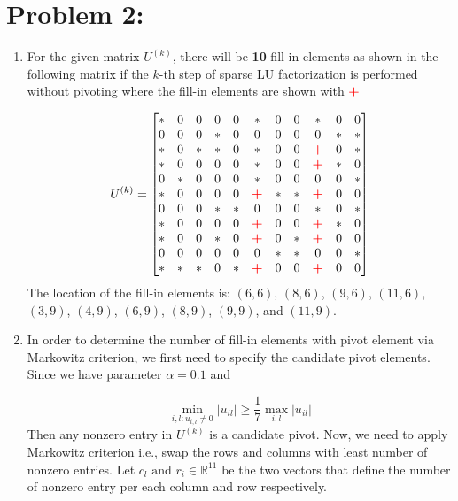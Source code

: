 \newpage
\section*{Problem 2:}
\begin{enumerate}
\item For the given matrix $U^{(k)}$, there will be \textbf{10} fill-in elements as shown in the following matrix if the $k$-th step of sparse LU factorization is performed without pivoting where the fill-in elements are shown with $\color{red}{\textbf{+}}$

$$
U^{(k)} = 
\setcounter{MaxMatrixCols}{11}
\begin{bmatrix}
* & 0 & 0 & 0 & 0 & * & 0 & 0 & * & 0 & 0 \\
0 & 0 & 0 & * & 0 & 0 & 0 & 0 & 0 & * & * \\
* & 0 & * & * & 0 & * & 0 & 0 & \color{red}{\textbf{+}} & 0 & * \\
* & 0 & 0 & 0 & 0 & * & 0 & 0 & \color{red}{\textbf{+}} & * & 0 \\
0 & * & 0 & 0 & 0 & * & 0 & 0 & 0 & 0 & * \\
* & 0 & 0 & 0 & 0 & \color{red}{\textbf{+}} & * & * & \color{red}{\textbf{+}} & 0 & 0 \\
0 & 0 & 0 & * & * & 0 & 0 & 0 & * & 0 & * \\
* & 0 & 0 & 0 & 0 & \color{red}{\textbf{+}} & 0 & 0 & \color{red}{\textbf{+}} & * & 0 \\
* & 0 & 0 & * & 0 & \color{red}{\textbf{+}} & 0 & * & \color{red}{\textbf{+}} & 0 & 0 \\
0 & 0 & 0 & 0 & 0 & 0 & * & * & 0 & 0 & * \\
* & * & * & 0 & * & \color{red}{\textbf{+}} & 0 & 0 & \color{red}{\textbf{+}} & 0 & 0 \\
\end{bmatrix}
$$
The location of the fill-in elements is: $(6,6)$, $(8,6)$, $(9,6)$, $(11,6)$, $(3,9)$, $(4,9)$, $(6,9)$, $(8,9)$, $(9,9)$, and $(11,9)$.

\item In order to determine the number of fill-in elements with pivot element via Markowitz criterion, we first need to specify the candidate pivot elements. Since we have parameter $\alpha = 0.1$ and

$$
\min_{i,l : u_{i,l}\neq 0} |u_{il}| \geq \frac{1}{7} \max_{i,l}|u_{il}|
$$
Then any nonzero entry in $U^{(k)}$ is a candidate pivot. Now, we need to apply Markowitz criterion i.e., swap the rows and columns with least number of nonzero entries. Let $c_{l} \text{\ and\ } r_{i} \in \mathbb{R}^{11}$ be the two vectors that define the number of nonzero entry per each column and row respectively. 


\end{enumerate}
